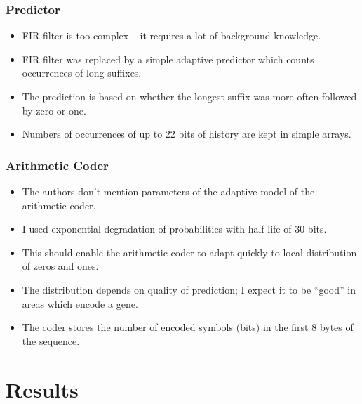 \documentclass[hyperref={colorlinks=true}]{beamer}
\begin{document}
\begin{frame}
\frametitle{Predictor}

\begin{itemize}
	\item FIR filter is too complex -- it requires a lot of background knowledge.
	\item FIR filter was replaced by a simple adaptive predictor which counts occurrences of long suffixes.
	\item The prediction is based on whether the longest suffix was more often followed by zero or one.
	\item Numbers of occurrences of up to 22 bits of history are kept in simple arrays.
\end{itemize}

\end{frame}

\begin{frame}
\frametitle{Arithmetic Coder}

\begin{itemize}
	\item The authors don't mention parameters of the adaptive model of the arithmetic coder.
	\item I used exponential degradation of probabilities with half-life of 30 bits.
	\item This should enable the arithmetic coder to adapt quickly to local distribution of zeros and ones.
	\item The distribution depends on quality of prediction; I expect it to be ``good'' in areas which encode a gene.
	\item The coder stores the number of encoded symbols (bits) in the first 8 bytes of the sequence.
\end{itemize}

\end{frame}

\section{Results}
\end{document}
